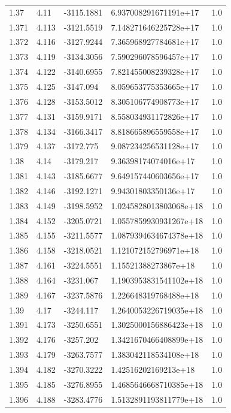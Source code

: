 \begin{tabular}{lllll}
1.37 & 4.11 & -3115.1881 & 6.937008291671191e+17 & 1.0 \\
1.371 & 4.113 & -3121.5519 & 7.148271646225728e+17 & 1.0 \\
1.372 & 4.116 & -3127.9244 & 7.365968927784681e+17 & 1.0 \\
1.373 & 4.119 & -3134.3056 & 7.590296078596457e+17 & 1.0 \\
1.374 & 4.122 & -3140.6955 & 7.821455008239328e+17 & 1.0 \\
1.375 & 4.125 & -3147.094 & 8.059653775353665e+17 & 1.0 \\
1.376 & 4.128 & -3153.5012 & 8.305106774908773e+17 & 1.0 \\
1.377 & 4.131 & -3159.9171 & 8.558034931172826e+17 & 1.0 \\
1.378 & 4.134 & -3166.3417 & 8.818665896559558e+17 & 1.0 \\
1.379 & 4.137 & -3172.775 & 9.087234256531128e+17 & 1.0 \\
1.38 & 4.14 & -3179.217 & 9.36398174074016e+17 & 1.0 \\
1.381 & 4.143 & -3185.6677 & 9.649157440603656e+17 & 1.0 \\
1.382 & 4.146 & -3192.1271 & 9.94301803350136e+17 & 1.0 \\
1.383 & 4.149 & -3198.5952 & 1.0245828013803068e+18 & 1.0 \\
1.384 & 4.152 & -3205.0721 & 1.0557859930931267e+18 & 1.0 \\
1.385 & 4.155 & -3211.5577 & 1.0879394634674378e+18 & 1.0 \\
1.386 & 4.158 & -3218.0521 & 1.121072152796971e+18 & 1.0 \\
1.387 & 4.161 & -3224.5551 & 1.15521388273867e+18 & 1.0 \\
1.388 & 4.164 & -3231.067 & 1.1903953831541102e+18 & 1.0 \\
1.389 & 4.167 & -3237.5876 & 1.226648319768488e+18 & 1.0 \\
1.39 & 4.17 & -3244.117 & 1.2640053226719035e+18 & 1.0 \\
1.391 & 4.173 & -3250.6551 & 1.3025000156886423e+18 & 1.0 \\
1.392 & 4.176 & -3257.202 & 1.3421670466408899e+18 & 1.0 \\
1.393 & 4.179 & -3263.7577 & 1.383042118534108e+18 & 1.0 \\
1.394 & 4.182 & -3270.3222 & 1.42516202169213e+18 & 1.0 \\
1.395 & 4.185 & -3276.8955 & 1.4685646668710385e+18 & 1.0 \\
1.396 & 4.188 & -3283.4776 & 1.5132891193811779e+18 & 1.0 \\

\end{tabular}
